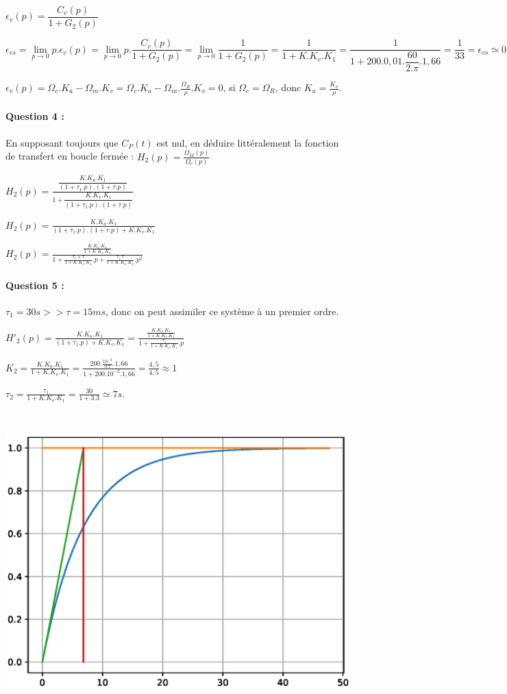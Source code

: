 $\epsilon_v(p)=\dfrac{C_v(p)}{1+G_2(p)}$

$\epsilon_{vs}=\lim\limits_{p \rightarrow 0} p.\epsilon_v(p)=\lim\limits_{p \rightarrow 0} p.\dfrac{C_v(p)}{1+G_2(p)}=\lim\limits_{p \rightarrow 0} \dfrac{1}{1+G_2(p)}=\dfrac{1}{1+K.K_v.K_1}=\dfrac{1}{1+200.0,01.\dfrac{60}{2.\pi}.1,66}=\dfrac{1}{33}=\epsilon_{vs}\simeq0,03$

$\epsilon_v(p)=\Omega_c.K_a-\Omega_m.K_v=\Omega_c.K_a-\Omega_m.\frac{\Omega_R}{\rho}.K_v=0$, si $\Omega_c=\Omega_R$, donc $K_a=\frac{K_v}{\rho}$.

\paragraph{Question 4 :} En supposant toujours que $C_P(t)$ est nul, en déduire littéralement la fonction de transfert en boucle fermée : $H_2(p)=\frac{\Omega_M(p)}{\Omega_c(p)}$	

$H_2(p)=\frac{\dfrac{K.K_a.K_1}{(1+\tau_1.p).(1+\tau.p)}}{1+\dfrac{K.K_v.K_1}{(1+\tau_1.p).(1+\tau.p)}}$

$H_2(p)=\frac{K.K_a.K_1}{(1+\tau_1.p).(1+\tau.p)+K.K_v.K_1}$

$H_2(p)=\frac{\frac{K.K_a.K_1}{1+K.K_v.K_1}}{1+\frac{\tau_1+\tau}{1+K.K_v.K_1}.p+\frac{\tau_1.\tau}{1+K.K_v.K_1}.p^2}$

\paragraph{Question 5 :} 

$\tau_1=30s >> \tau=15ms$, donc on peut assimiler ce système à un premier ordre.

$H'_2(p)=\frac{K.K_a.K_1}{(1+\tau_1.p)+K.K_v.K_1}=\frac{\frac{K.K_a.K_1}{1+K.K_v.K_1}}{1+\frac{\tau_1}{1+K.K_v.K_1}.p}$

$K_2=\frac{K.K_a.K_1}{1+K.K_v.K_1}=\frac{200.\frac{10^{-2}}{0.7}.1,66}{1+200.10^{-2}.1,66}=\frac{4,5}{4,5}\approx 1$

$\tau_2=\frac{\tau_1}{1+K.K_v.K_1}=\frac{30}{1+3.3}\simeq7s.$

~\

\begin{center}
\includegraphics[width=0.7\linewidth]{img/motoreduc_courbe_cor}
\end{center}

